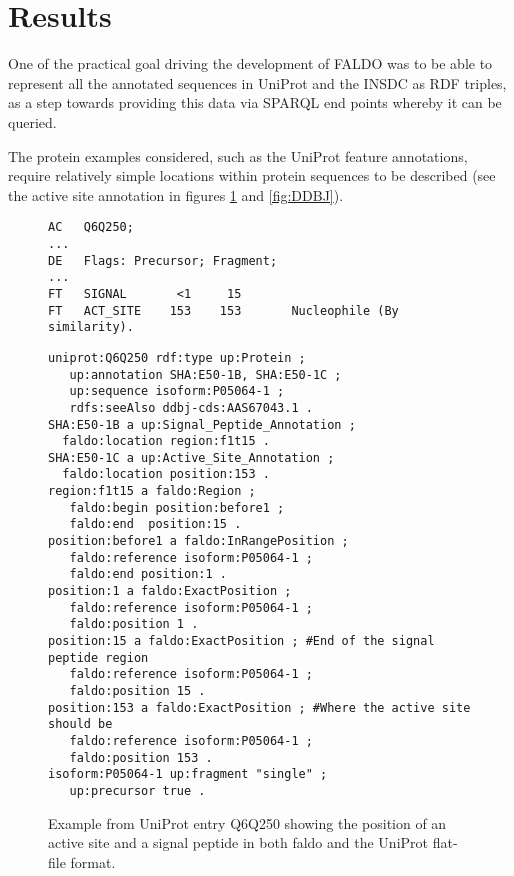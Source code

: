 \section*{Results}
One of the practical goal driving the development of FALDO was to be able
to represent all the annotated sequences in UniProt and the INSDC as RDF
triples, as a step towards providing this data via SPARQL end points whereby
it can be queried.

The protein examples considered, such as the UniProt feature annotations,
require relatively simple locations within protein sequences to be described (see the active site annotation in figures \ref{fig:UniProt} and \ref{fig:DDBJ}).

\begin{figure}
\begin{shaded}
\small
\begin{verbatim}
AC   Q6Q250;
...
DE   Flags: Precursor; Fragment;
...
FT   SIGNAL       <1     15
FT   ACT_SITE    153    153       Nucleophile (By similarity).
\end{verbatim}
\begin{verbatim}
uniprot:Q6Q250 rdf:type up:Protein ;
   up:annotation SHA:E50-1B, SHA:E50-1C ;
   up:sequence isoform:P05064-1 ;
   rdfs:seeAlso ddbj-cds:AAS67043.1 .
SHA:E50-1B a up:Signal_Peptide_Annotation ;
  faldo:location region:f1t15 .
SHA:E50-1C a up:Active_Site_Annotation ;
  faldo:location position:153 .
region:f1t15 a faldo:Region ;
   faldo:begin position:before1 ;
   faldo:end  position:15 .
position:before1 a faldo:InRangePosition ;
   faldo:reference isoform:P05064-1 ;
   faldo:end position:1 . 
position:1 a faldo:ExactPosition ;
   faldo:reference isoform:P05064-1 ;
   faldo:position 1 .
position:15 a faldo:ExactPosition ; #End of the signal peptide region
   faldo:reference isoform:P05064-1 ;
   faldo:position 15 .   
position:153 a faldo:ExactPosition ; #Where the active site should be
   faldo:reference isoform:P05064-1 ;
   faldo:position 153 .
isoform:P05064-1 up:fragment "single" ;
   up:precursor true .
\end{verbatim}
\end{shaded}
\caption{Example from UniProt entry Q6Q250 showing the position of an active site and a signal peptide in both faldo and the UniProt flat-file format.}
\label{fig:UniProt}
\end{figure}
